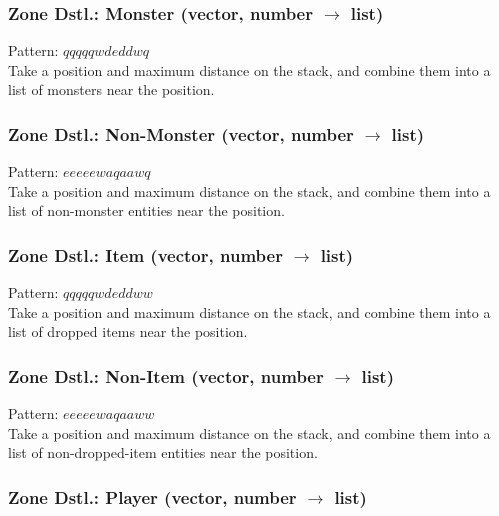 \documentclass[12pt]{article}
\begin{document}
  \label{sec: patterns/entities@hexcasting:zone_entity/monster}
\subsubsection*{Zone Dstl.: Monster (vector, number $\rightarrow$ list)}

    Pattern: $qqqqqwdeddwq$\\
      Take a position and maximum distance on the stack, and combine them into a list of monsters near the position.\\


  \label{sec: patterns/entities@hexcasting:zone_entity/not_monster}
\subsubsection*{Zone Dstl.: Non-Monster (vector, number $\rightarrow$ list)}

    Pattern: $eeeeewaqaawq$\\
      Take a position and maximum distance on the stack, and combine them into a list of non-monster entities near the position.\\


  \label{sec: patterns/entities@hexcasting:zone_entity/item}
\subsubsection*{Zone Dstl.: Item (vector, number $\rightarrow$ list)}

    Pattern: $qqqqqwdeddww$\\
      Take a position and maximum distance on the stack, and combine them into a list of dropped items near the position.\\


  \label{sec: patterns/entities@hexcasting:zone_entity/not_item}
\subsubsection*{Zone Dstl.: Non-Item (vector, number $\rightarrow$ list)}

    Pattern: $eeeeewaqaaww$\\
      Take a position and maximum distance on the stack, and combine them into a list of non-dropped-item entities near the position.\\


  \label{sec: patterns/entities@hexcasting:zone_entity/player}
\subsubsection*{Zone Dstl.: Player (vector, number $\rightarrow$ list)}
\end{document}
